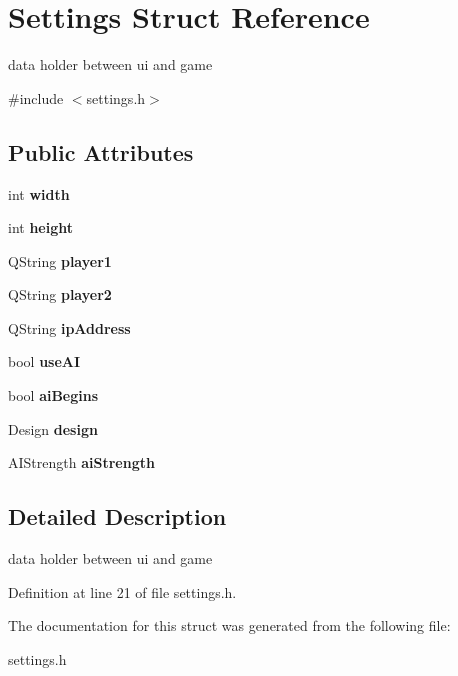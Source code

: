 \hypertarget{struct_settings}{\section{Settings Struct Reference}
\label{struct_settings}
}


data holder between ui and game  




{\ttfamily \#include $<$settings.\-h$>$}

\subsection*{Public Attributes}
\begin{DoxyCompactItemize}
\item 
\hypertarget{struct_settings_ac5a707ab0e620e9aeb22d98478197506}{int {\bfseries width}}\label{struct_settings_ac5a707ab0e620e9aeb22d98478197506}

\item 
\hypertarget{struct_settings_af63a2c25f93b1f54a88f9217e95fbcc0}{int {\bfseries height}}\label{struct_settings_af63a2c25f93b1f54a88f9217e95fbcc0}

\item 
\hypertarget{struct_settings_a02c5d891df66d91711d7ef348bc0a98a}{Q\-String {\bfseries player1}}\label{struct_settings_a02c5d891df66d91711d7ef348bc0a98a}

\item 
\hypertarget{struct_settings_af36a424cc1c71f670f4e0b221f1ac2d4}{Q\-String {\bfseries player2}}\label{struct_settings_af36a424cc1c71f670f4e0b221f1ac2d4}

\item 
\hypertarget{struct_settings_a5dd01adc93a126d0c4443b9e04906388}{Q\-String {\bfseries ip\-Address}}\label{struct_settings_a5dd01adc93a126d0c4443b9e04906388}

\item 
\hypertarget{struct_settings_a0d2542ef361af07d3a52243c46305541}{bool {\bfseries use\-A\-I}}\label{struct_settings_a0d2542ef361af07d3a52243c46305541}

\item 
\hypertarget{struct_settings_aa510d772b330cc005608bb764d8aaf2b}{bool {\bfseries ai\-Begins}}\label{struct_settings_aa510d772b330cc005608bb764d8aaf2b}

\item 
\hypertarget{struct_settings_afbfb0309eead50812c931b71fa35289d}{Design {\bfseries design}}\label{struct_settings_afbfb0309eead50812c931b71fa35289d}

\item 
\hypertarget{struct_settings_aa5022e1d185a0f826d2684cd76613090}{A\-I\-Strength {\bfseries ai\-Strength}}\label{struct_settings_aa5022e1d185a0f826d2684cd76613090}

\end{DoxyCompactItemize}


\subsection{Detailed Description}
data holder between ui and game 

Definition at line 21 of file settings.\-h.



The documentation for this struct was generated from the following file\-:\begin{DoxyCompactItemize}
\item 
settings.\-h\end{DoxyCompactItemize}
